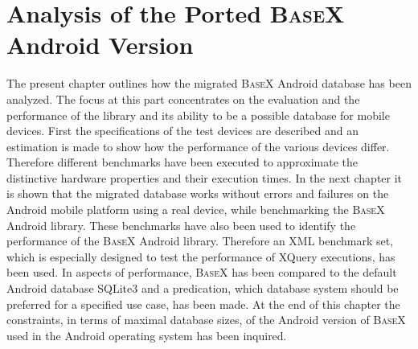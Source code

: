 \chapter{Analysis of the Ported \textsc{BaseX} Android Version}
\label{cha:analysis}
The present chapter outlines how the migrated \textsc{BaseX} Android database has been analyzed.
The focus at this part concentrates on the evaluation and the performance of the library and its ability to be a possible database for mobile devices.
First the specifications of the test devices are described and an estimation is made to show how the performance of the various devices differ.
Therefore different benchmarks have been executed to approximate the distinctive hardware properties and their execution times.
In the next chapter it is shown that the migrated database works without errors and failures on the Android mobile platform using a real device, while benchmarking the \textsc{BaseX} Android library.
These benchmarks have also been used to identify the performance of the \textsc{BaseX} Android library. 
Therefore an XML benchmark set, which is especially designed to test the performance of XQuery executions, has been used.
In aspects of performance, \textsc{BaseX} has been compared to the default Android database SQLite3 and a predication, which database system should be preferred for a specified use case, has been made.
At the end of this chapter the constraints, in terms of maximal database sizes, of the Android version of \textsc{BaseX} used in the Android operating system has been inquired.

